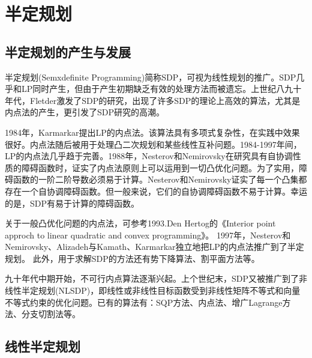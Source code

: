 % 
\chapter{半定规划}
\section{半定规划的产生与发展}
    \par
    半定规划(Semxdefinite Programming)简称SDP，可视为线性规划的推广。SDP几乎和LP同时产生，但由于产生初期缺乏有效的处理方法而被遗忘。上世纪八九十年代，Fletder激发了SDP的研究，出现了许多SDP的理论上高效的算法，尤其是内点法的产生，更引发了SDP研究的高潮。
    \par
    1984年，Karmarkar提出LP的内点法。该算法具有多项式复杂性，在实践中效果很好。内点法随后被用于处理凸二次规划和某些线性互补问题。1984-1997年间，LP的内点法几乎趋于完善。1988年，Nesterov和Nemirovsky在研究具有自协调性质的障碍函数时，证实了内点法原则上可以运用到一切凸优化问题。为了实用，障碍函数的一阶二阶导数必须易于计算。Nesterov和Nemirovsky证实了每一个凸集都存在一个自协调障碍函数。但一般来说，它们的自协调障碍函数不易于计算。幸运的是，SDP有易于计算的障碍函数。
    \par
    关于一般凸优化问题的内点法，可参考1993.Den Hertog的《Interior point approch to linear quadratic and convex programming》。
    1997年，Nesterov和Nemirovsky、Alizadeh与Kamath、Karmarkar独立地把LP的内点法推广到了半定规划。
    此外，用于求解SDP的方法还有势下降算法、割平面方法等。
    \par
    九十年代中期开始，不可行内点算法逐渐兴起。上个世纪末，SDP又被推广到了非线性半定规划(NLSDP)，即线性或非线性目标函数受到非线性矩阵不等式和向量不等式约束的优化问题。已有的算法有：SQP方法、内点法、增广Lagrange方法、分支切割法等。
\section{线性半定规划}
